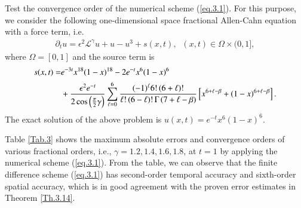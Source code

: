 \documentclass{siamart171218}
\numberwithin{theorem}{section}
\numberwithin{equation}{section}
\begin{document}
\begin{example}\label{Ex.2}
Test the convergence order of the numerical scheme
(\ref{eq.3.1}). For this purpose, we consider
the following one-dimensional space fractional
Allen-Cahn equation with a force term, i.e.
\begin{equation*}
\begin{aligned}\displaystyle
\partial_tu=\epsilon^2\mathscr{L}^\gamma u
+u-u^3+s(x,t),\;\;(x,t)\in\Omega\times(0,1],
\end{aligned}
\end{equation*}
where $\Omega =[0,1]$ and the source term is
\begin{equation*}
\begin{aligned}\displaystyle
s(x,t)=&e^{-3 t}
x^{18}(1-x)^{18}
-2e^{-t}x^{6}(1-x)^{6}\displaystyle\vspace{0.2cm}\\&
+\frac{\epsilon^2e^{-t}}{2\cos\left(\frac{\pi}{2}\gamma\right)}
\sum_{\ell=0}^{6}\frac{(-1)^{\ell}6!\,(6+\ell)!}{\ell!\,(6-\ell)!\,\Gamma\left(7+\ell-\beta\right)}
\left[x^{6+\ell-\beta}+\left(1-x\right)^{6+\ell-\beta}\right].
\end{aligned}
\end{equation*}
The exact solution of the above problem is $u(x, t)=e^{-t}x^6(1-x)^6$.

Table \ref{Tab.3} shows the maximum absolute errors and convergence orders of various
fractional orders, i.e., $\gamma=1.2,1.4,1.6,1.8$, at $t = 1$ by applying
 the numerical scheme (\ref{eq.3.1}).
From the table, we can observe that the finite
difference scheme  (\ref{eq.3.1}) has second-order temporal
accuracy and sixth-order spatial accuracy,
which is in good agreement with the proven error estimates in Theorem \ref{Th.3.14}.


\end{example}
\end{document}
